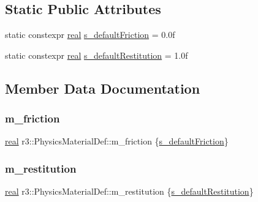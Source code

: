 \subsection*{Static Public Attributes}
\begin{DoxyCompactItemize}
\item 
static constexpr \mbox{\hyperlink{namespacer3_ab2016b3e3f743fb735afce242f0dc1eb}{real}} \mbox{\hyperlink{structr3_1_1_physics_material_def_a491a5e29b693bd20a7a8708f13c7f473}{s\+\_\+default\+Friction}} = 0.\+0f
\item 
static constexpr \mbox{\hyperlink{namespacer3_ab2016b3e3f743fb735afce242f0dc1eb}{real}} \mbox{\hyperlink{structr3_1_1_physics_material_def_a994308068cb88f266dd5f9f63f320add}{s\+\_\+default\+Restitution}} = 1.\+0f
\end{DoxyCompactItemize}


\subsection{Member Data Documentation}
\mbox{\label{structr3_1_1_physics_material_def_aef82d9585791c1470ab92c6efa57b1b9}} 
\subsubsection{\texorpdfstring{m\+\_\+friction}{m\_friction}}
{\footnotesize\ttfamily \mbox{\hyperlink{namespacer3_ab2016b3e3f743fb735afce242f0dc1eb}{real}} r3\+::\+Physics\+Material\+Def\+::m\+\_\+friction \{\mbox{\hyperlink{structr3_1_1_physics_material_def_a491a5e29b693bd20a7a8708f13c7f473}{s\+\_\+default\+Friction}}\}}

\mbox{\label{structr3_1_1_physics_material_def_abf6dd41075d432324d9524e18f041a87}} 
\subsubsection{\texorpdfstring{m\+\_\+restitution}{m\_restitution}}
{\footnotesize\ttfamily \mbox{\hyperlink{namespacer3_ab2016b3e3f743fb735afce242f0dc1eb}{real}} r3\+::\+Physics\+Material\+Def\+::m\+\_\+restitution \{\mbox{\hyperlink{structr3_1_1_physics_material_def_a994308068cb88f266dd5f9f63f320add}{s\+\_\+default\+Restitution}}\}}

